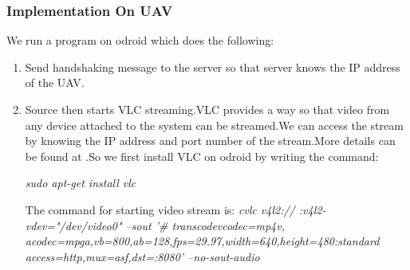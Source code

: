 \documentclass[12pt]{article}
\begin{document}
\subsubsection{Implementation On UAV}
We run a program on odroid which does the following:
 
\begin{enumerate}
\item Send handshaking message to the server so that server knows the IP address of the UAV.
\item Source then starts VLC streaming.VLC provides a way so that video from any device attached to the system can be streamed.We can access the stream by knowing the IP address and port number of the stream.More details can be found at \cite{4}.So we first install VLC on odroid by writing the command:
\begin{center}
\textit{sudo apt-get install vlc}
\end{center}
The command for starting video stream is: \newline\newline
\textit{cvlc v4l2:// :v4l2-vdev="/dev/video0" --sout '\# transcode{vcodec=mp4v,
acodec=mpga,vb=800,ab=128,fps=29.97,width=640,height=480}:standard  {access=http,mux=asf,dst=:8080}' --no-sout-audio}


\end{enumerate}
\end{document}
